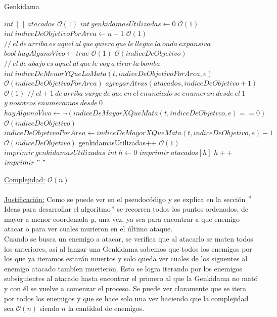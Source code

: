 \documentclass[10pt,a4paper]{article}
\begin{document}
\begin{algorithm}
\caption{Genkidama}
\begin{algorithmic}
  	\State $int~[~]~ atacados$ \Comment $\mathcal{O}(1)$
  	\State $int ~genkidamasUtilizadas \gets 0$ \Comment $\mathcal{O}(1)$
	\State $int ~indiceDeObjetivoPorArea \gets n - 1$ \Comment $\mathcal{O}(1)$
	\State $ //~el~ de~ arriba~ es~ aquel~ al~ que~ quiero~ que~ le~ llegue~ la~ onda~ expansiva$
	\State $bool ~hayAlgunoVivo \gets true$ \Comment $\mathcal{O}(1)$
	 \Comment $\mathcal{O}(indiceDeObjetivo)$
		\State $ 	//~el~ de~ abajo ~es~ aquel~ al~ que~ le~ voy~ a ~tirar~ la~ bomba$
		\State $int~indiceDeMenorYQueLoMata(t, indiceDeObjetivoPorArea, e)$ \Comment $\mathcal{O}(indiceDeObjetivoPorArea)$
		\State $agregarAtras(atacados, indiceDeObjetivo + 1)$ \Comment $\mathcal{O}(1)$
		\State $		//~el +1 ~de~ arriba~ surge~ de~ que~ en~ el~ enunciado ~se~ enumeran~ desde~ el~ 1 ~$
		\State $	   y~ nosotros~ enumeramos~ desde~ 0$
		\State $hayAlgunoVivo \gets \neg(indiceDeMayorXQueMata(t, indiceDeObjetivo, e) == 0)$ \Comment $\mathcal{O}(indiceDeObjetivo)$
		\State $indiceDeObjetivoPorArea \gets indiceDeMayorXQueMata(t, indiceDeObjetivo, e) - 1$ \Comment $\mathcal{O}(indiceDeObjetivo)$
		\State genkidamasUtilizadas++ \Comment $\mathcal{O}(1)$
	\EndWhile
	\State $imprimir ~genkidamasUtilizadas$
	\State $int~ h \gets 0$
			\State $imprimir ~atacados[h]$
			\State $h++$
					\State $imprimir ~"~"~$
			\EndIf
	\EndWhile
\EndFunction
\end{algorithmic}
\underline{Complejidad:} $\mathcal{O}(n)$\\
\\
\underline{Justificación:} Como se puede ver en el pseudocódigo y se explica en la sección $"$Ideas para desarrollar el algoritmo$"$ se recorren todos los puntos ordenados, de mayor a menor coordenada $y$, una vez, ya sea para encontrar a que enemigo atacar o para ver cuales murieron en el último ataque.\\
Cuando se busca un enemigo a atacar, se verifica que al atacarlo se maten todos los anteriores, así al lanzar una Genkidama sabemos que todos los enemigos por los que ya iteramos estarán muertos y solo queda ver cuales de los siguentes al enemigo atacado tambíen muerieron. Esto se logra iterando por los enemigos subsiguientes al atacado hasta encontrar el primero al que la Genkidama no mató y con él se vuelve a comenzar el proceso. Se puede ver claramente que se itera por todos los enemigos y que se hace solo una vez haciendo que la complejidad sea $\mathcal{O}(n)$ siendo $n$ la cantidad de enemigos.
    
\end{algorithm}
\end{document}
